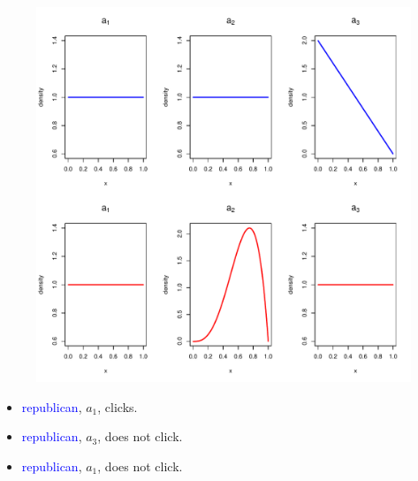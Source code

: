 \documentclass{beamer}
\begin{document}
\begin{frame}
  \begin{figure}
    \includegraphics[scale=.5]{b4.pdf}
  \end{figure}
\end{frame}

\begin{frame}
  \begin{itemize}
    \item{\textcolor{blue}{republican}, $a_1$,  clicks.}
    \item{\textcolor{blue}{republican}, $a_3$,  does not click.}
    \item{\textcolor{blue}{republican}, $a_1$,  does not click.}
  \end{itemize}
\end{frame}
\end{document}
